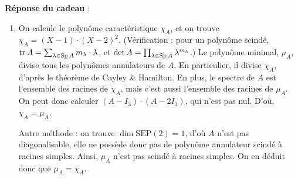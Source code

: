 \documentclass[a4paper]{article}
\begin{document}
	\bigskip\bigskip
	\textbf{Réponse du cadeau} :\\
	\begin{enumerate}
		\item On calcule le polynôme caractéristique $\chi_A$, et on trouve $\chi_A = (X - 1) \cdot (X-2)^2$.
			(Vérification : pour un polynôme scindé, $\operatorname{tr} A = \sum_{\lambda \in \operatorname{Sp} A} m_\lambda \cdot \lambda$, et $\operatorname{det} A = \prod_{\lambda \in \operatorname{Sp} A} \lambda^{m_\lambda}$.)
			Le polynôme minimal, $\mu_A$, divise tous les polynômes annulateurs de $A$.
			En particulier, il divise $\chi_A$, d'après le théorème de Cayley \& Hamilton.
			En plus, le spectre de $A$ est l'ensemble des racines de $\chi_A$, mais c'est aussi l'ensemble des racines de $\mu_A$.
			On peut donc calculer $(A-I_3) \cdot (A - 2I_3)$, qui n'est pas nul.
			D'où, $\chi_A = \mu_A$.

			Autre méthode : on trouve $\dim \mathrm{SEP}(2) = 1$, d'où $A$ n'est pas diagonalisable, elle ne possède donc pas de polynôme annulateur scindé à racines simples.
			Ainsi, $\mu_A$ n'est pas scindé à racines simples.
			On en déduit donc que $\mu_A = \chi_A$.


\end{enumerate}
\end{document}
